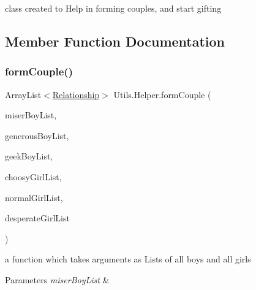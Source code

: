 class created to Help in forming couples, and start gifting 

\subsection{Member Function Documentation}
\mbox{\label{class_utils_1_1_helper_a6f1c53ad1e8be4c45607b2f2a54dc455}} 
\subsubsection{\texorpdfstring{form\+Couple()}{formCouple()}}
{\footnotesize\ttfamily Array\+List$<$\hyperlink{class_utils_1_1_relationship}{Relationship}$>$ Utils.\+Helper.\+form\+Couple (\begin{DoxyParamCaption}\item[{Array\+List$<$ \hyperlink{class_boys_1_1_miser_boy}{Miser\+Boy} $>$}]{miser\+Boy\+List,  }\item[{Array\+List$<$ \hyperlink{class_boys_1_1_generous_boy}{Generous\+Boy} $>$}]{generous\+Boy\+List,  }\item[{Array\+List$<$ \hyperlink{class_boys_1_1_geek_boy}{Geek\+Boy} $>$}]{geek\+Boy\+List,  }\item[{Array\+List$<$ \hyperlink{class_girls_1_1_choosy_girl}{Choosy\+Girl} $>$}]{choosy\+Girl\+List,  }\item[{Array\+List$<$ \hyperlink{class_girls_1_1_normal_girl}{Normal\+Girl} $>$}]{normal\+Girl\+List,  }\item[{Array\+List$<$ \hyperlink{class_girls_1_1_desperate_girl}{Desperate\+Girl} $>$}]{desperate\+Girl\+List }\end{DoxyParamCaption})\hspace{0.3cm}{\ttfamily [inline]}}

a function which takes arguments as Lists of all boys and all girls 
\begin{DoxyParams}{Parameters}
{\em miser\+Boy\+List} & \\
\hline
\end{DoxyParams}
\mbox{\label{class_utils_1_1_helper_a16d1ffc86896f16d999a016abe9a7fbd}} 
